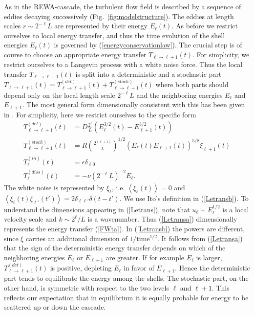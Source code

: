 \documentclass[dc]{svjour}
\begin{document}
As in the REWA-cascade, the turbulent flow field is
described by a sequence of eddies decaying successively
(Fig.~\ref{fig:modelstructure}). The eddies at
length scales $r\sim 2^{-\ell}L$ are represented by their energy
$E_{\ell}(t)$.
As before we restrict ourselves to local energy transfer,
and thus the time evolution of the
shell energies $E_{\ell}(t)$ is governed by
(\ref{energyconservationlaw}). The crucial step is of course to choose
an appropriate energy transfer $T_{\ell\rightarrow\ell+1}(t)$.
For simplicity, we restrict ourselves to a Langevin process with a white
noise force. Thus the local transfer $T_{\ell\rightarrow \ell+1}(t)$ is
split into a deterministic and a stochastic part $T_{\ell\rightarrow
  \ell+1}(t) = T_{\ell\rightarrow \ell+1}^{(det)}(t)+
T_{\ell\rightarrow\ell+1}^{(stoch)}(t)$ where both
parts should depend only on the local length scale $2^{-\ell}L$ and
the neighboring energies $E_{\ell}$ and $E_{\ell+1}$. The most
general form dimensionally consistent with this has been given in
\cite{eggers94}. For simplicity, here we restrict ourselves to the specific
form
  \begin{align}
  \label{Letrans}
    T_{\ell\rightarrow \ell+1}^{(det)}(t)&= D
    \frac{2^{\ell}}{L}\left(E_{\ell}^{3/2}(t)-E_{\ell+1}^{3/2}(t)\right)
    \label{Letransa}\\
    T_{\ell\rightarrow \ell+1}^{(stoch)}(t)&= R
    \left(\frac{2^{(\ell+1)}}{L}\right)^{1/2}
      (E_{\ell}(t)E_{\ell+1}(t))^{5/8}
      \xi_{\ell+1}(t)\label{Letransb}\\
      T_{\ell}^{(in)}(t)&= \epsilon
    \delta_{\ell 0} \label{Letransc}\\
     T^{(diss)}_{\ell}(t) &=
        -\nu(2^{-\ell}L)^{-2} E_{\ell} . \label{Letransd}
  \end{align}
%
The white noise is represented by
$\xi_{\ell}$, i.e. $\left<\xi_{\ell}(t)\right>=0$ and
$\left<\xi_{\ell}(t)\xi_{\ell'}(t')\right>=2\delta_{\ell\ell'}\delta(t-t')$.
We use Ito's \cite{gardiner83} definition in (\ref{Letransb}).
To understand the dimensions appearing in (\ref{Letrans}), note
that $u_{\ell} \sim E_{\ell}^{1/2}$ is a local velocity scale and
$k \sim 2^{\ell}/L$ is a wavenumber. Thus (\ref{Letransa})
dimensionally represents the energy transfer (\ref{FWta}).
In (\ref{Letransb}) the powers are different, since $\xi$ carries
an additional dimension of $1/\mbox{time}^{1/2}$.
It follows from (\ref{Letransa}) that the sign of the deterministic
energy transfer depends on which of the neighboring energies
$E_{\ell}$ or $E_{\ell+1}$ are greater. If for example $E_{\ell}$
is larger, $T^{(det)}_{\ell\rightarrow\ell+1}(t)$ is positive,
depleting $E_{\ell}$ in favor of $E_{\ell+1}$. Hence the
deterministic part tends to equilibrate the energy among the
shells. The stochastic part, on the other hand, is symmetric with
respect to the two levels $\ell$ and $\ell+1$. This reflects
our expectation that in equilibrium it is equally probable for
energy to be scattered up or down the cascade.
\end{document}
